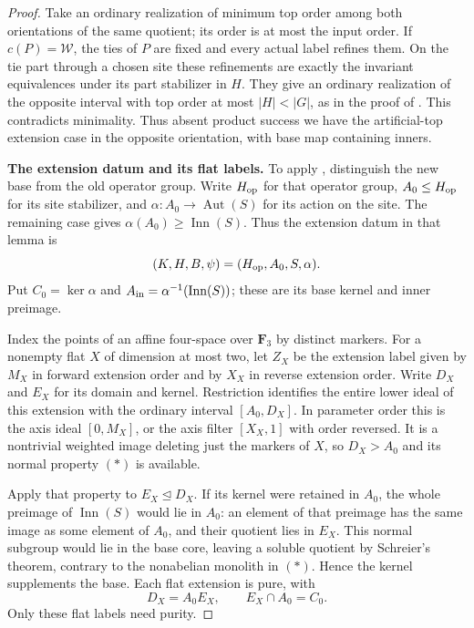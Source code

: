 \begin{proof}
Take an ordinary realization of minimum top order among both orientations
of the same quotient; its order is at most the input order.  If
\(c(P)=\mathcal W\), the ties of \(P\) are fixed and every actual label
refines them.  On the tie part through a chosen site these refinements are
exactly the invariant equivalences under its part stabilizer in \(H\).
They give an ordinary realization of the opposite interval with top order
at most \(|H|<|G|\), as in the proof of .
This contradicts minimality. Thus absent product success we have the artificial-top extension
case in the opposite orientation, with base map containing inners.

\noindent\textbf{The extension datum and its flat labels.}
To apply , distinguish the new base from the
old operator group.  Write \(H_{\rm op}\) for that operator group,
\(A_0\le H_{\rm op}\) for its site stabilizer, and
\(\alpha:A_0\to\operatorname{Aut}(S)\) for its action on the site.
The remaining case gives \(\alpha(A_0)\ge\operatorname{Inn}(S)\).
Thus the extension datum in that lemma is
\[
 (K,H,B,\psi)=(H_{\rm op},A_0,S,\alpha).
\]
Put \(C_0=\ker\alpha\) and
\(A_{\rm in}=\alpha^{-1}(\operatorname{Inn}(S))\); these are its
base kernel and inner preimage.

Index the points of an affine four-space over \(\mathbf F_3\) by
distinct markers.  For a nonempty flat \(X\) of dimension at most two,
let \(Z_X\) be the extension label given by \(M_X\) in forward
extension order and by \(X_X\) in reverse extension order.  Write
\(D_X\) and \(E_X\) for its domain and kernel.  Restriction identifies
the entire lower ideal of this extension with the ordinary interval
\([A_0,D_X]\).  In parameter order this is the axis ideal
\([0,M_X]\), or the axis filter \([X_X,1]\) with order reversed.
It is a nontrivial weighted image deleting just the markers of \(X\),
so \(D_X>A_0\) and its normal property \((*)\) is available.

Apply that property to \(E_X\trianglelefteq D_X\).  If its kernel
were retained in \(A_0\), the whole preimage of
\(\operatorname{Inn}(S)\) would lie in \(A_0\): an element of that
preimage has the same image as some element of \(A_0\), and their
quotient lies in \(E_X\).  This normal subgroup would lie in the base
core, leaving a soluble quotient by Schreier's theorem, contrary to
the nonabelian monolith in \((*)\).  Hence the kernel supplements
the base.  Each flat extension is pure, with
\[
 D_X=A_0E_X,\qquad E_X\cap A_0=C_0.
\]
Only these flat labels need purity.


\end{proof}
